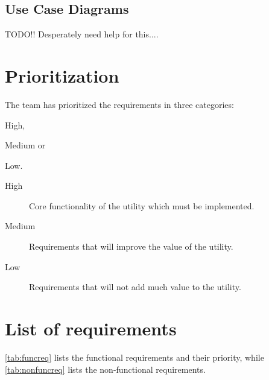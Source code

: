 \subsection{Use Case Diagrams}
TODO!! Desperately need help for this....

\section{Prioritization}
\label{sec:reqspriority}
The team has prioritized the requirements in three categories:
\begin{inparaenum}
	\item High,
	\item Medium or
	\item Low.
\end{inparaenum} 

\begin{description}
	\item[High] Core functionality of the utility which must be implemented.
	\item[Medium] Requirements that will improve the value of the utility.
	\item[Low] Requirements that will not add much value to the utility.
\end{description}

\section{List of requirements}
\label{sec:reqslist}
\autoref{tab:funcreq} lists the functional requirements and their priority,
while \autoref{tab:nonfuncreq} lists the non-functional requirements.

